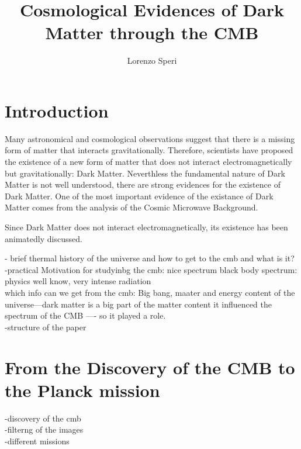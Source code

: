 \documentclass{article}
\title{Cosmological Evidences of Dark Matter through the CMB}
\author{Lorenzo Speri}
\date{}
\begin{document}
\maketitle


\section{Introduction}
Many astronomical and cosmological observations suggest that there is a missing form of matter that interacts gravitationally. 
Therefore, scientists have proposed the existence of a new form of matter that does not interact electromagnetically but gravitationally: Dark Matter.
Neverthless the fundamental nature of Dark Matter is not well understood, there are strong evidences for the existence of Dark Matter. 
One of the most important evidence of the existance of Dark Matter comes from the analysis of the Cosmic Microwave Background.



Since Dark Matter does not interact electromagnetically, its existence has been animatedly discussed.


-\citep{WayneHu} brief thermal history of the universe and how to get to the cmb and what is it?\\
-practical Motivation for studyinbg the cmb: nice spectrum black body spectrum: physics well know, very intense radiation\\
which info can we get from the cmb: Big bang, maater and energy content of the universe---dark matter is a big part of the matter content it influenced the spectrum  of the CMB ---- so it played a role.\\
-structure of the paper \\




\section{From the Discovery of the CMB to the Planck mission}
\citep{bucherPhysicsCosmicMicrowave2015}
-discovery of the cmb\\
-filterng of the images\\
-different missions\\
\end{document}
